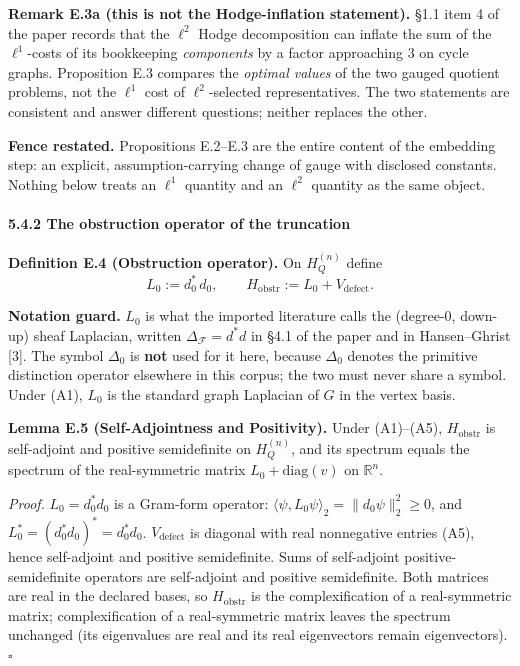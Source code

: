 \documentclass[
]{article}
\begin{document}
\textbf{Remark E.3a (this is not the Hodge-inflation statement).} §1.1 item 4 of the paper records that the \(\ell^2\) Hodge decomposition can inflate the sum of the \(\ell^1\)-costs of its bookkeeping \emph{components} by a factor approaching \(3\) on cycle graphs. Proposition E.3 compares the \emph{optimal values} of the two gauged quotient problems, not the \(\ell^1\) cost of \(\ell^2\)-selected representatives. The two statements are consistent and answer different questions; neither replaces the other.

\textbf{Fence restated.} Propositions E.2--E.3 are the entire content of the embedding step: an explicit, assumption-carrying change of gauge with disclosed constants. Nothing below treats an \(\ell^1\) quantity and an \(\ell^2\) quantity as the same object.

\paragraph{5.4.2 The obstruction operator of the truncation}\label{the-obstruction-operator-of-the-truncation}

\textbf{Definition E.4 (Obstruction operator).} On \(H_Q^{(n)}\) define
\[L_0 := d_0^*\, d_0 , \qquad H_{\mathrm{obstr}} := L_0 + V_{\mathrm{defect}} .\]

\textbf{Notation guard.} \(L_0\) is what the imported literature calls the (degree-0, down-up) sheaf Laplacian, written \(\Delta_{\mathcal{F}} = d^*d\) in §4.1 of the paper and in Hansen--Ghrist {[}3{]}. The symbol \(\Delta_0\) is \textbf{not} used for it here, because \(\Delta_0\) denotes the primitive distinction operator elsewhere in this corpus; the two must never share a symbol. Under (A1), \(L_0\) is the standard graph Laplacian of \(G\) in the vertex basis.

\textbf{Lemma E.5 (Self-Adjointness and Positivity).} Under (A1)--(A5), \(H_{\mathrm{obstr}}\) is self-adjoint and positive semidefinite on \(H_Q^{(n)}\), and its spectrum equals the spectrum of the real-symmetric matrix \(L_0 + \mathrm{diag}(v)\) on \(\mathbb{R}^n\).

\emph{Proof.} \(L_0 = d_0^* d_0\) is a Gram-form operator: \(\langle \psi, L_0 \psi \rangle_2 = \|d_0 \psi\|_2^2 \ge 0\), and \(L_0^* = (d_0^* d_0)^* = d_0^* d_0\). \(V_{\mathrm{defect}}\) is diagonal with real nonnegative entries (A5), hence self-adjoint and positive semidefinite. Sums of self-adjoint positive-semidefinite operators are self-adjoint and positive semidefinite. Both matrices are real in the declared bases, so \(H_{\mathrm{obstr}}\) is the complexification of a real-symmetric matrix; complexification of a real-symmetric matrix leaves the spectrum unchanged (its eigenvalues are real and its real eigenvectors remain eigenvectors). \(\square\)
\end{document}
